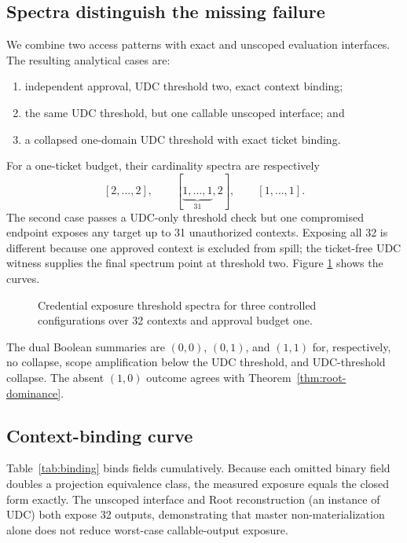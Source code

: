 \documentclass[preprint,12pt]{elsarticle}
\begin{document}
\subsection{Spectra distinguish the missing failure}

We combine two access patterns with exact and unscoped evaluation interfaces.
The resulting analytical cases are:

\begin{enumerate}[leftmargin=*]
\item independent approval, UDC threshold two, exact context binding;
\item the same UDC threshold, but one callable unscoped interface; and
\item a collapsed one-domain UDC threshold with exact ticket binding.
\end{enumerate}

For a one-ticket budget, their cardinality spectra are respectively
\[
[2,\ldots,2],\qquad [\underbrace{1,\ldots,1}_{31},2],\qquad
[1,\ldots,1].
\]
The second case passes a UDC-only threshold check but one compromised endpoint
exposes any target up to 31 unauthorized contexts.  Exposing all 32 is different
because one approved context is excluded from spill; the ticket-free UDC
witness supplies the final spectrum point at threshold two.  Figure
\ref{fig:spectra} shows the curves.

\begin{figure}[t]
\centering

\caption{Credential exposure threshold spectra for three controlled
configurations over 32 contexts and approval budget one.}
\label{fig:spectra}
\end{figure}

The dual Boolean summaries are $(0,0)$, $(0,1)$, and $(1,1)$ for, respectively,
no collapse, scope amplification below the UDC threshold, and UDC-threshold
collapse.  The absent $(1,0)$ outcome agrees with
Theorem~\ref{thm:root-dominance}.

\subsection{Context-binding curve}

Table~\ref{tab:binding} binds fields cumulatively.  Because each omitted binary
field doubles a projection equivalence class, the measured exposure equals the
closed form exactly.  The unscoped interface and Root reconstruction (an
instance of UDC) both
expose 32 outputs, demonstrating that master non-materialization alone does not
reduce worst-case callable-output exposure.
\end{document}
